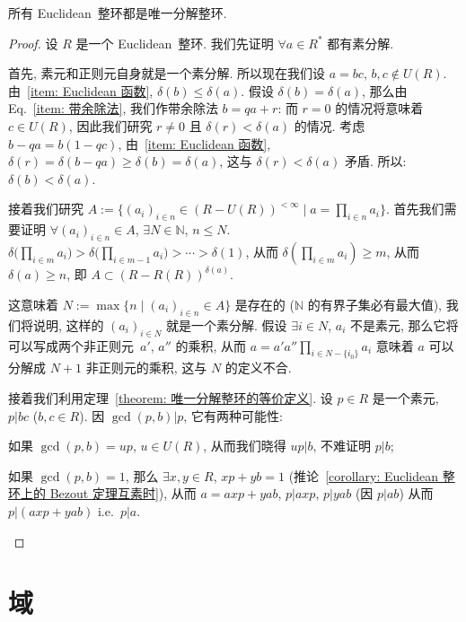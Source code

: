 \documentclass[openany, a5paper, oneside]{ctexbook}
\begin{document}
\begin{theorem}\label{theorem: Euclidean 整环是唯一分解的}
	所有 Euclidean~整环都是唯一分解整环.
\end{theorem}
\begin{proof}
	设 $R$ 是一个 Euclidean~整环. 我们先证明 $\forall a \in R^*$ 都有素分解. 
	
	首先, 素元和正则元自身就是一个素分解. 
	所以现在我们设 $a = bc$, $b, c \notin U(R)$. 
	由~\ref{item: Euclidean 函数}, $\delta(b) \leq \delta(a) $. 
	假设 $\delta(b) = \delta(a)$, 那么由 Eq.~\eqref{item: 带余除法}, 我们作带余除法 $b = qa + r$: 
	而 $r = 0$ 的情况将意味着 $c \in U(R)$, 因此我们研究 $r \neq 0$ 且 $\delta(r) < \delta(a)$ 的情况. 
	考虑 $b - qa = b(1 - qc)$, 由~\ref{item: Euclidean 函数}, $\delta(r) = \delta(b - qa) \geq \delta(b) = \delta(a)$, 这与 $\delta(r) < \delta(a)$ 矛盾. 
	所以: $\delta(b) < \delta(a)$.

	接着我们研究 $A := \{(a_i)_{i \in n} \in (R - U(R))^{< \infty} \mid a = \prod_{i \in n} a_i\}$. 
	首先我们需要证明 $\forall (a_i)_{i \in n} \in A$, $\exists N \in \mathbb N$, $n \leq N$. 
	$\delta \big(\prod_{i \in m} a_i) > \delta\big(\prod_{i \in m - 1} a_i) > \cdots > \delta(1)$, 从而 $\delta(\prod_{i \in m} a_i) \geq m$, 从而 $\delta(a) \geq n$, 即 $A \subset (R - R(R))^{\delta(a)}$. 
	
	这意味着 $N := \max\{n \mid (a_i)_{i \in n} \in A\}$ 是存在的 ($\mathbb N$ 的有界子集必有最大值), 我们将说明, 这样的 $(a_i)_{i \in N}$ 就是一个素分解. 
	假设 $\exists i \in N$, $a_i$ 不是素元, 那么它将可以写成两个非正则元~$a'$, $a''$ 的乘积, 从而 $a = a' a''\prod_{i \in N - \{i_0\}} a_i$ 意味着 $a$ 可以分解成 $N + 1$ 非正则元的乘积, 这与 $N$ 的定义不合.

	接着我们利用定理~\ref{theorem: 唯一分解整环的等价定义}. 
	设 $p \in R$ 是一个素元, $p | bc$ ($b, c \in R$). 因 $\gcd(p, b) | p$, 它有两种可能性: 
	\begin{conditionlist}[label = \roman*)]
		\item 如果 $\gcd(p, b) = up$, $u \in U(R)$, 从而我们晓得 $up | b$, 不难证明 $p |b$; 
		\item 如果 $\gcd(p, b) = 1$, 那么 $\exists x, y \in R$, $xp + yb = 1$ 
			(推论~\ref{corollary: Euclidean 整环上的 Bezout 定理互素时}), 
		从而 $a = axp + yab$, $p | axp$, $p | yab$ (因 $p | ab$) 从而 $p | (axp + yab)$ i.e.\ $p | a$. 
	\end{conditionlist}
\end{proof}

\section{域}
\end{document}

